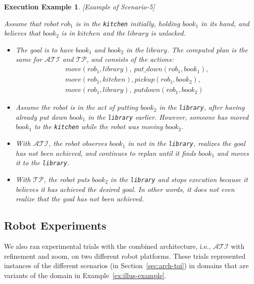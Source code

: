 \documentclass[letterpaper, 10 pt, conference]{ieeeconf}  %
\newcommand{\stt}[1]{{\small\texttt{#1}}}
\newtheorem{execexample}{\bf Execution Example}
\begin{document}
\begin{execexample}\label{exec:example2}[Example of Scenario-5]\\
  {\rm Assume that robot $rob_1$ is in the \stt{kitchen} initially,
    holding $book_1$ in its hand, and believes that $book_2$ is in
    $kitchen$ and the $library$ is unlocked.
    \begin{itemize}
    \item The goal is to have $book_1$ and $book_2$ in the $library$.
      The computed plan is the same for $\mathcal{ATI}$ and
      $\mathcal{TP}$, and consists of the actions:
      \begin{align*}
        &move(rob_1, library),~put\_down(rob_1, book_1),\\
        &move(rob_1, kitchen), pickup(rob_1, book_2),\\
        &move(rob_1, library), ~putdown(rob_1, book_2)
      \end{align*}
    
    \item Assume the robot is in the act of putting $book_2$ in the
      \stt{library}, after having already put down $book_1$ in the
      \stt{library} earlier. However, someone has moved $book_1$ to
      the \stt{kitchen} while the robot was moving $book_2$.

    \item With $\mathcal{ATI}$, the robot observes $book_1$ in not in
      the \stt{library}, realizes the goal has not been achieved, and
      continues to replan until it finds $book_1$ and moves it to the
      \stt{library}.

    \item With $\mathcal{TP}$, the robot puts $book_2$ in the
      \stt{library} and stops execution because it believes it has
      achieved the desired goal. In other words, it does not even
      realize that the goal has not been achieved.
    \end{itemize}
  }
\end{execexample}


\subsection{Robot Experiments}
\label{sec:expres-robots}
We also ran experimental trials with the combined architecture, i.e.,
$\mathcal{ATI}$ with refinement and zoom, on two different robot
platforms. These trials represented instances of the different
scenarios (in Section~\ref{sec:arch-toi}) in domains that are variants
of the domain in Example~\ref{ex:illus-example}.
\end{document}
